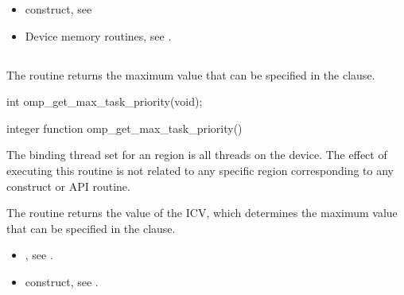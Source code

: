 \crossreferences
\begin{itemize}
\item {} construct, see 

\item Device memory routines, see .
\end{itemize}




\subsection{}
\label{subsec:omp_get_max_task_priority}
\summary

The  routine returns the maximum value that can be
specified in the  clause.

\pagebreak

\begin{samepage}
\format
\ccppspecificstart
\begin{boxedcode}
int omp\_get\_max\_task\_priority(void);
\end{boxedcode}
\ccppspecificend
\end{samepage}

\fortranspecificstart
\begin{boxedcode}
integer function omp\_get\_max\_task\_priority()
\end{boxedcode}
\fortranspecificend

\binding

The binding thread set for an  region is all threads
on the device. The effect of executing this routine is not related to any specific region
corresponding to any construct or API routine.

\effect

The  routine returns the value of the 
ICV, which determines the maximum value that can be specified in the  clause.

\crossreferences

\begin{itemize}
\item {}, see 
.

\item {} construct, see 
. 
\end{itemize}










